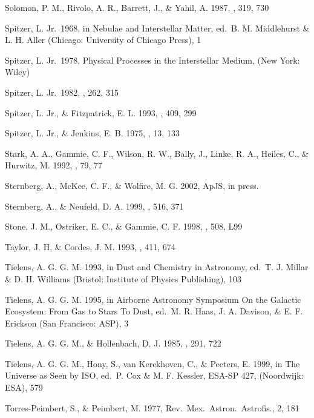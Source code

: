 \documentclass[12pt,preprint,flushrt]{aastex}
\begin{document}
\begin{thebibliography}{}
Solomon, P. M., Rivolo, A. R., 
Barrett, J., \& Yahil, A. 1987, \apj, 319, 730
 
Spitzer, L. Jr.\ 1968,
in Nebulae and Interstellar Matter, ed.\ B. M. Middlehurst \&
L. H. Aller (Chicago: University of Chicago Press),  1

Spitzer, L. Jr.\ 1978,
Physical Processes in the Interstellar Medium, (New York: Wiley)

Spitzer, L. Jr.\ 1982, \apj, 262, 315

Spitzer, L. Jr., \& Fitzpatrick,
E. L. 1993, \apj, 409, 299

Spitzer, L. Jr., \& 
Jenkins, E. B. 1975, \araa, 13, 133

Stark, A. A., Gammie, C. F., Wilson, R. W.,
Bally, J., Linke, R. A., Heiles, C., \& Hurwitz, M. 1992, \apjs, 79, 77

Sternberg, A.,
McKee, C. F., \& Wolfire, M. G. 2002, ApJS, in press.

Sternberg, A., \& Neufeld, D. A.
1999, \apj, 516, 371

 Stone, J. M., Ostriker, 
E. C., \& Gammie, C. F. 1998, \apj, 508, L99

Taylor, J. H, \& Cordes, J. M.
1993, \apj, 411, 674

Tielens, A. G. G. M. 1993, in Dust and
Chemistry in Astronomy,  ed.\ T. J. Millar \& D. H. Williams (Bristol:
Institute of Physics Publishing), 103

Tielens, A. G. G. M. 1995, in 
Airborne Astronomy Symposium On the Galactic Ecosystem: From Gas
to Stars To Dust, ed.\ M. R. Haas, J. A. Davison, \& E. F. Erickson
(San Francisco: ASP), 3 

 Tielens, A. G. G. M., \&
Hollenbach, D. J. 1985, \apj, 291, 722

 Tielens, A. G. G. M.,
Hony, S., van Kerckhoven, C., \& Peeters, E. 1999, in {The Universe
as Seen by ISO}, ed.\ P. Cox \& M. F. Kessler, ESA-SP 427, (Noordwijk:
ESA), 579

Torres-Peimbert, S., \&
Peimbert, M. 1977, Rev.\ Mex.\ Astron.\ Astrofis., 2, 181


\end{thebibliography}
\end{document}
